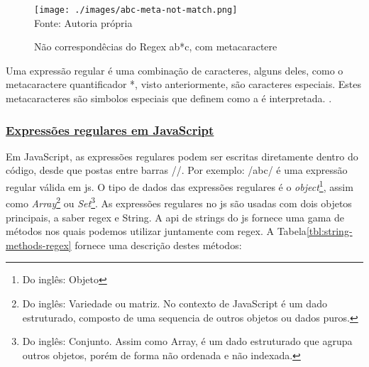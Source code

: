 \begin{figure}[H]
    \centering
    \caption{Não correspondêcias do Regex ab*c, com metacaractere}
    \texttt{[image: ./images/abc-meta-not-match.png]}
    \label{fig:abc-meta-not-match} \\
    \textnormal{\fontsize{10pt}{12pt}Fonte: Autoria própria}
\end{figure}

Uma expressão regular é uma combinação de caracteres, alguns
deles, como o metacaractere quantificador *, visto
anteriormente, são caracteres especiais. Estes metacaracteres
são simbolos especiais que definem como a é interpretada.
\cite{dp6-regex}.

\subsubsection{\underline{Expressões regulares em JavaScript}}

Em JavaScript, as expressões regulares podem ser escritas diretamente dentro do código,
desde que postas entre barras //. Por exemplo: /abc/ é uma expressão regular válida em
\acrshort{js}.
O tipo de dados das expressões regulares é
o
\textit{object}\footnote{Do inglês: Objeto
}, assim como
\textit{Array}\footnote{Do inglês: Variedade ou matriz. No contexto de JavaScript é um dado estruturado,
    composto de uma sequencia de outros objetos ou dados puros.
}
ou
\textit{Set}\footnote{Do inglês: Conjunto. Assim como Array, é um dado estruturado que agrupa outros
    objetos, porém de forma não ordenada e não indexada.
}. As expressões regulares no
\acrshort{js}
são usadas com dois objetos principais, a saber
\acrshort{regex}
e
String.
A
\acrshort{api}
de strings do
\acrshort{js}
fornece uma gama de métodos nos quais podemos utilizar
juntamente com
\acrshort{regex}.
A Tabela\ref{tbl:string-methods-regex}
fornece uma descrição destes métodos:

